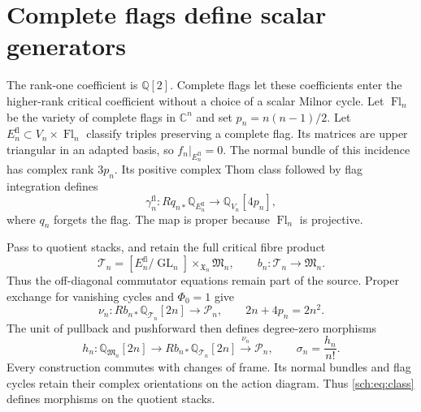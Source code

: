\section{Complete flags define scalar generators}
\label{sch:sec:flags}

The rank-one coefficient is $\mathbb Q[2]$. Complete flags let these
coefficients enter the higher-rank critical coefficient without a choice
of a scalar Milnor cycle.
Let $\operatorname{Fl}_n$ be the variety of complete flags in
$\mathbb C^n$ and set $p_n=n(n-1)/2$.
Let $E_n^{\mathrm{fl}}\subset V_n\times\operatorname{Fl}_n$ classify
triples preserving a complete flag. Its matrices are upper triangular
in an adapted basis, so $f_n|_{E_n^{\mathrm{fl}}}=0$.
The normal bundle of this incidence has complex rank $3p_n$.
Its positive complex Thom class followed by flag integration defines
\[
 \gamma_n^{\mathrm{fl}}:
 Rq_{n*}\mathbb Q_{E_n^{\mathrm{fl}}}
       \longrightarrow\mathbb Q_{V_n}[4p_n],
\]
where $q_n$ forgets the flag. The map is proper because
$\operatorname{Fl}_n$ is projective.

Pass to quotient stacks, and retain the full critical fibre product
\[
 \mathcal T_n=[E_n^{\mathrm{fl}}/\operatorname{GL}_n]
                    \mathbin{\times}_{\mathfrak X_n}\mathfrak M_n,
 \qquad b_n:\mathcal T_n\longrightarrow\mathfrak M_n.
\]
Thus the off-diagonal commutator equations remain part of the source.
Proper exchange for vanishing cycles and $\Phi_0=1$ give
\[
 \nu_n:Rb_{n*}\mathbb Q_{\mathcal T_n}[2n]
       \longrightarrow\mathcal P_n,
 \qquad 2n+4p_n=2n^2.
\]
The unit of pullback and pushforward then defines degree-zero morphisms
\begin{equation}
 h_n:\mathbb Q_{\mathfrak M_n}[2n]
 \longrightarrow Rb_{n*}\mathbb Q_{\mathcal T_n}[2n]
 \xrightarrow{\nu_n}\mathcal P_n,
 \qquad \sigma_n=\frac{h_n}{n!}.
 \label{sch:eq:class}
\end{equation}
Every construction commutes with changes of frame. Its normal bundles
and flag cycles retain their complex orientations on the action diagram.
Thus \eqref{sch:eq:class} defines morphisms on the quotient stacks.


